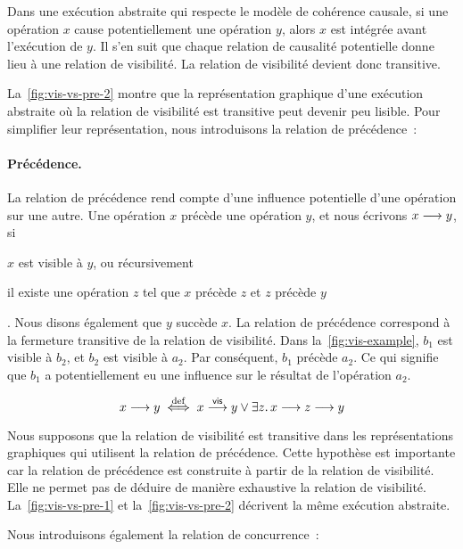 Dans une exécution abstraite qui respecte le modèle de cohérence causale, si une opération $x$ cause potentiellement une opération $y$, alors $x$ est intégrée avant l'exécution de $y$.
Il s'en suit que chaque relation de causalité potentielle donne lieu à une relation de visibilité.
La relation de visibilité devient donc transitive.

La~\autoref{fig:vis-vs-pre-2} montre que la représentation graphique d'une exécution abstraite où la relation de visibilité est transitive peut devenir peu lisible.
Pour simplifier leur représentation, nous introduisons la relation de précédence~:

\paragraph{Précédence.}
La relation de précédence rend compte d'une influence potentielle d'une opération sur une autre.
Une opération $x$ précède une opération $y$, et nous écrivons $x \longrightarrow y$, si \begin{inlinelist}
    \item $x$ est visible à $y$, ou récursivement
    \item il existe une opération $z$ tel que $x$ précède $z$ et $z$ précède $y$
\end{inlinelist}.
Nous disons également que $y$ succède $x$.
La relation de précédence correspond à la fermeture transitive de la relation de visibilité.
Dans la~\autoref{fig:vis-example}, $b_1$ est visible à $b_2$, et $b_2$ est visible à $a_2$.
Par conséquent, $b_1$ précède $a_2$.
Ce qui signifie que $b_1$ a potentiellement eu une influence sur le résultat de l'opération $a_2$.

\begin{equation*}
    x \longrightarrow y \overset{\mathrm{def}}{\iff} x \overset{\mathsf{vis}}{\longrightarrow} y \lor \exists z \ldotp x \longrightarrow z \longrightarrow y
\end{equation*}

\begin{remark}
Nous supposons que la relation de visibilité est transitive dans les représentations graphiques qui utilisent la relation de précédence.
Cette hypothèse est importante car la relation de précédence est construite à partir de la relation de visibilité.
Elle ne permet pas de déduire de manière exhaustive la relation de visibilité.
La~\autoref{fig:vis-vs-pre-1} et la~\autoref{fig:vis-vs-pre-2} décrivent la même exécution abstraite.
\end{remark}

Nous introduisons également la relation de concurrence~:

